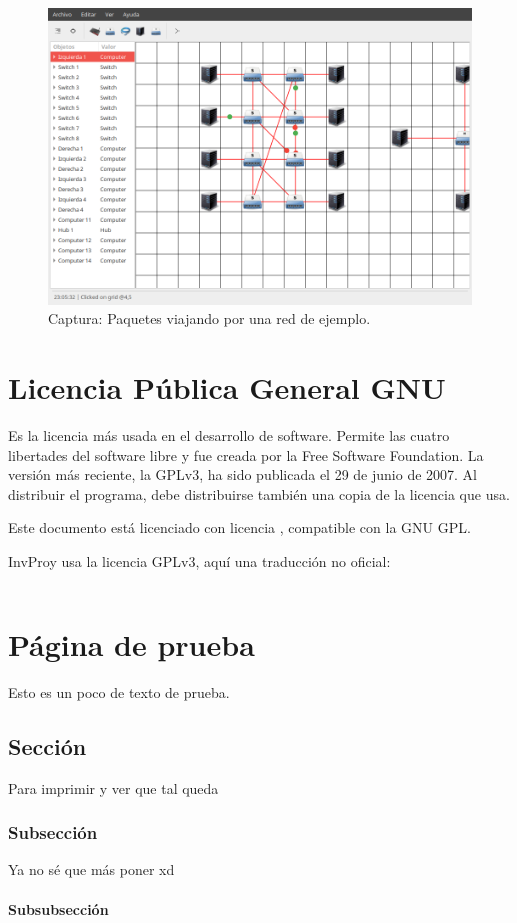 \documentclass[a4paper, 11pt]{report} %
\begin{document}
\begin{figure}[H]
\includegraphics[width=\textwidth]{Resources/Screenshots/2016-09-12-230644_1000x700_scrot.png}
\caption{Captura: Paquetes viajando por una red de ejemplo.}
\label{fig:samplenet}
\end{figure}

\chapter[Licencia GNU GPL]{Licencia Pública General GNU}
\label{gnugpl}
Es la licencia más usada en el desarrollo de software. Permite las cuatro libertades del software libre y fue creada por la Free Software Foundation. La versión más reciente, la GPLv3, ha sido publicada el 29 de junio de 2007. Al distribuir el programa, debe distribuirse también una copia de la licencia que usa.

Este documento está licenciado con licencia \doclicenseLongNameRef, compatible con la GNU GPL.

InvProy usa la licencia GPLv3, aquí una traducción no oficial\cite{gpltranslation}:
\inputminted[baselinestretch=1, fontsize=\scriptsize, linenos, breaklines]{text}{GPLv3-spanish.txt}
%



\newpage
\chapter*{Página de prueba}
Esto es un poco de texto de prueba.
\section*{Sección}
Para imprimir y ver que tal queda
\subsection*{Subsección}
Ya no sé que más poner xd
\subsubsection*{Subsubsección}

\newpage
\thispagestyle{empty}
\vspace*{\fill}
\doclicenseThis
\vspace*{\fill}
\end{document}
